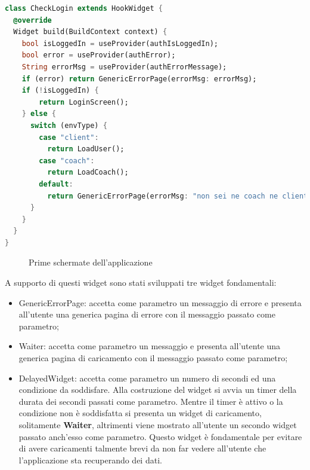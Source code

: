 \begin{lstlisting}[language=dart, firstnumber=1, caption={Widget CheckLogin}]
class CheckLogin extends HookWidget {
  @override
  Widget build(BuildContext context) {
    bool isLoggedIn = useProvider(authIsLoggedIn);
    bool error = useProvider(authError);
    String errorMsg = useProvider(authErrorMessage);
    if (error) return GenericErrorPage(errorMsg: errorMsg);
    if (!isLoggedIn) {
        return LoginScreen();
    } else {
      switch (envType) {
        case "client":
          return LoadUser();
        case "coach":
          return LoadCoach();
        default:
          return GenericErrorPage(errorMsg: "non sei ne coach ne client");
      }
    }
  }
}
\end{lstlisting}
\begin{center}
\begin{figure}[H]
\hspace{0.1cm}
\hspace{0.1cm}
\caption{Prime schermate dell'applicazione}
\end{figure}
\end{center}
A supporto di questi widget sono stati sviluppati tre widget fondamentali:
\begin{itemize}
    \item GenericErrorPage: accetta come parametro un messaggio di errore e presenta all'utente una generica pagina di errore con il messaggio passato come parametro;
    \item Waiter: accetta come parametro un messaggio e presenta all'utente una generica pagina di caricamento con il messaggio passato come parametro;
    \item DelayedWidget: accetta come parametro un numero di secondi ed una condizione da soddisfare. Alla costruzione del widget si avvia un timer della durata dei secondi passati come parametro. Mentre il timer è attivo o la condizione non è soddisfatta si presenta un widget di caricamento, solitamente \textbf{Waiter}, altrimenti viene mostrato all'utente un secondo widget passato anch'esso come parametro. Questo widget è fondamentale per evitare di avere caricamenti talmente brevi da non far vedere all'utente che l'applicazione sta recuperando dei dati.
\end{itemize}
